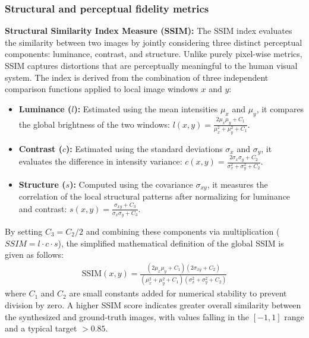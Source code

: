 \documentclass[11pt,a4paper]{article}
\begin{document}
\subsubsection*{Structural and perceptual fidelity metrics}
\noindent
\textbf{Structural Similarity Index Measure (SSIM):} The SSIM index \cite{wang2004image} evaluates the similarity between two images by jointly considering three distinct perceptual components: luminance, contrast, and structure. Unlike purely pixel-wise metrics, SSIM captures distortions that are perceptually meaningful to the human visual system. The index is derived from the combination of three independent comparison functions applied to local image windows $x$ and $y$:
\begin{itemize}
    \item \textbf{Luminance ($l$):} Estimated using the mean intensities $\mu_x$ and $\mu_y$, it compares the global brightness of the two windows: $l(x, y) = \frac{2\mu_x\mu_y + C_1}{\mu_x^2 + \mu_y^2 + C_1}$.
    \item \textbf{Contrast ($c$):} Estimated using the standard deviations $\sigma_x$ and $\sigma_y$, it evaluates the difference in intensity variance: $c(x, y) = \frac{2\sigma_x\sigma_y + C_2}{\sigma_x^2 + \sigma_y^2 + C_2}$.
    \item \textbf{Structure ($s$):} Computed using the covariance $\sigma_{xy}$, it measures the correlation of the local structural patterns after normalizing for luminance and contrast: $s(x, y) = \frac{\sigma_{xy} + C_3}{\sigma_x\sigma_y + C_3}$.
\end{itemize}
By setting $C_3 = C_2 / 2$ and combining these components via multiplication ($SSIM = l \cdot c \cdot s$), the simplified mathematical definition of the global SSIM is given as follows:
\begin{align}
    \text{SSIM}(x, y) = \frac{(2\mu_x\mu_y + C_1)(2\sigma_{xy} + C_2)}{(\mu_x^2 + \mu_y^2 + C_1)(\sigma_x^2 + \sigma_y^2 + C_2)}
\end{align}
where $C_1$ and $C_2$ are small constants added for numerical stability to prevent division by zero. A higher SSIM score indicates greater overall similarity between the synthesized and ground-truth images, with values falling in the $[-1, 1]$ range and a typical target $> 0.85$.
\end{document}
